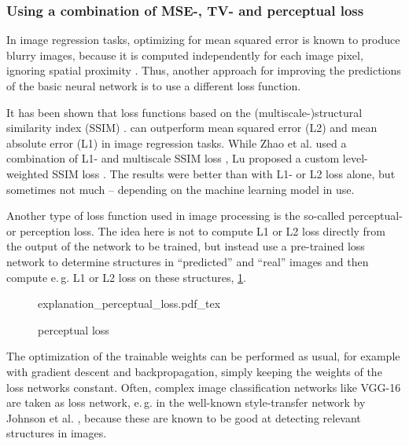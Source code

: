 \subsubsection{Using a combination of MSE-, TV- and perceptual loss} \label{sec:improve:combined_loss}
In image regression tasks, optimizing for mean squared error is known to produce blurry images,
because it is computed independently for each image pixel, ignoring spatial proximity \cite{Isola2017,Lu2019}.
Thus, another approach for improving the predictions of the basic neural network is to use a different loss function.

It has been shown that loss functions based on the (multiscale-)structural similarity index (SSIM) \cite{Wang2003}. 
can outperform mean squared error (L2) and mean absolute error (L1) in image regression tasks.
While Zhao et al. used a combination of L1- and multiscale SSIM loss \cite{Zhao2017},
Lu proposed a custom level-weighted SSIM loss \cite{Lu2019}.
The results were better than with L1- or L2 loss alone, but sometimes not much -- depending on the machine learning model in use.

Another type of loss function used in image processing is the so-called perceptual- or perception loss.
The idea here is not to compute L1 or L2 loss directly from the output of the network to be trained,
but instead use a pre-trained loss network to determine structures in ``predicted'' and ``real'' images
and then compute e.\,g. L1 or L2 loss on these structures, \cref{fig:improve:perceptual_loss}.
\begin{figure}[htb]
    \small
    \centering
    {explanation_perceptual_loss.pdf_tex}%
    \caption{perceptual loss}
    \label{fig:improve:perceptual_loss}
\end{figure}
The optimization of the trainable weights can be performed as usual, for example with gradient descent and backpropagation, 
simply keeping the weights of the loss networks constant.
Often, complex image classification networks like VGG-16 \cite{Simonyan2015} are taken as loss network, e.\,g. in the well-known style-transfer network by Johnson et al. \cite{Johnson2016},
because these are known to be good at detecting relevant structures in images.

